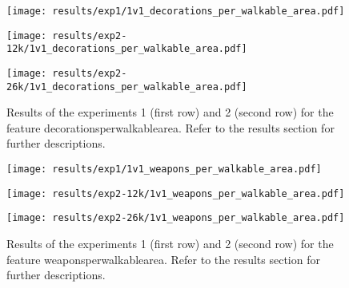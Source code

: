 \begin{figure}[h!]
	\centering
	\begin{minipage}{0.4\linewidth}
		\texttt{[image: results/exp1/1v1\_decorations\_per\_walkable\_area.pdf]}
	\end{minipage}
	
	\begin{minipage}{0.4\linewidth}
		\texttt{[image: results/exp2-12k/1v1\_decorations\_per\_walkable\_area.pdf]}
	\end{minipage}
	\begin{minipage}{0.4\linewidth}
		\texttt{[image: results/exp2-26k/1v1\_decorations\_per\_walkable\_area.pdf]}
	\end{minipage}
	
	\caption[ Results: Feature decorations\textunderscore per\textunderscore walkable\textunderscore area]{ Results of the experiments 1 (first row) and 2 (second row) for the feature decorations\textunderscore per\textunderscore walkable\textunderscore area. Refer to the results section for further descriptions. }
	\label{fig:appendix_decorations_per_walkable_area}
\end{figure}

\begin{figure}[h!]
	\centering
	\begin{minipage}{0.4\linewidth}
		\texttt{[image: results/exp1/1v1\_weapons\_per\_walkable\_area.pdf]}
	\end{minipage}
	
	\begin{minipage}{0.4\linewidth}
		\texttt{[image: results/exp2-12k/1v1\_weapons\_per\_walkable\_area.pdf]}
	\end{minipage}
	\begin{minipage}{0.4\linewidth}
		\texttt{[image: results/exp2-26k/1v1\_weapons\_per\_walkable\_area.pdf]}
	\end{minipage}
	
	\caption[ Results: Feature weapons\textunderscore per\textunderscore walkable\textunderscore area]{ Results of the experiments 1 (first row) and 2 (second row) for the feature weapons\textunderscore per\textunderscore walkable\textunderscore area. Refer to the results section for further descriptions. }
	\label{fig:appendix_weapons_per_walkable_area}
\end{figure}
\newpage 


